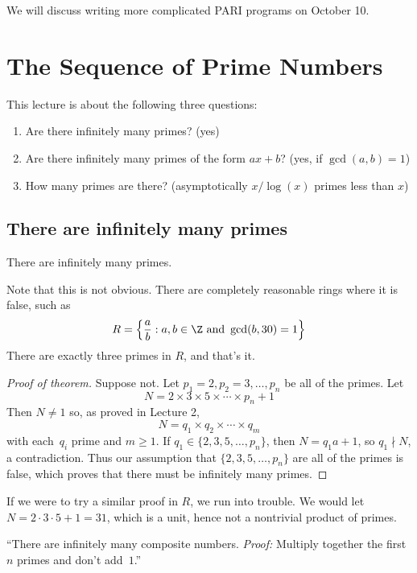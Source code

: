 \documentclass[11pt]{report}
\begin{document}
We will discuss writing more complicated PARI programs on October 10.




\chapter{The Sequence of Prime Numbers}




This lecture is about the following three questions:
\begin{enumerate}
  \item Are there infinitely many primes? (yes)
  \item Are there infinitely many primes of the form $ax+b$?  (yes, if $\gcd(a,b)=1$)
  \item How many primes are there? (asymptotically $x/\log(x)$ primes less than $x$)
\end{enumerate}

\section{There are infinitely many primes}
\begin{theorem}[Euclid]
  There are infinitely many primes.
\end{theorem}
Note that this is not obvious.  There are completely reasonable rings
where it is false, such as
$$
  R = \left\{\frac{a}{b} : a, b\in\Z \text{ and }\gcd(b,30)=1\right\}
$$
There are exactly three primes in $R$, and that's it.
\begin{proof}[Proof of theorem]
  Suppose not.  Let $p_1=2, p_2=3, \ldots, p_n$ be all of the primes.
  Let
  $$
    N=2\times 3\times 5 \times \cdots \times p_n + 1
  $$
  Then $N\neq 1$ so, as proved in Lecture 2,
  $$N = q_1\times q_2 \times \cdots \times q_m$$
  with each~$q_i$ prime and $m\geq 1$.
  If $q_1\in\{2,3,5,\ldots,p_n\}$, then
  $N = q_1 a + 1$, so $q_1\nmid N$, a contradiction.
  Thus our assumption that
  $\{2,3,5,\ldots,p_n\}$
  are all of the primes is false, which proves
  that there must be infinitely many primes.
\end{proof}

If we were to try a similar proof in $R$, we run into trouble.
We would let $N=2\cdot 3\cdot 5 + 1 = 31$, which is a unit,
hence not a nontrivial product of primes.

\vspace{1ex}
  ``There are infinitely many composite
numbers.  {\em Proof:} Multiply together the first~$n$ primes and don't add~$1$.''
\vspace{1ex}\\
\end{document}
